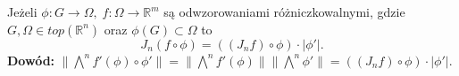 \begin{lem}
	Jeżeli $\phi: G \rightarrow \Omega, \; f: \Omega \rightarrow \mathbb{R}^m$ są odwzorowaniami różniczkowalnymi, gdzie $G, \Omega \in top(\mathbb{R}^n)$ oraz $\phi(G) \subset \Omega$ to $$
		J_n (f \circ \phi) = ((J_nf) \circ \phi) \cdot |\phi'| .
	$$
	\textbf{Dowód:}\newline
	$\| \bigwedge^n f'(\phi) \circ \phi' \| = \| \bigwedge^n f'(\phi) \| \| \bigwedge^n \phi' \| = ((J_nf) \circ \phi) \cdot |\phi'|$. 
\end{lem}